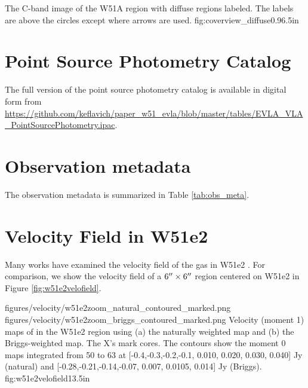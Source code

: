 {The C-band image of the W51A region with diffuse \hii regions labeled.  The labels
are above the circles except where arrows are used.}
{fig:coverview_diffuse}{0.9}{6.5in}

%

\clearpage
\section{Point Source Photometry Catalog}
\label{sec:SEDs}
The full version of the point source photometry catalog is available in digital
form from
\url{https://github.com/keflavich/paper_w51_evla/blob/master/tables/EVLA_VLA_PointSourcePhotometry.ipac}.



\section{Observation metadata}
\label{sec:obsmeta}
The observation metadata is summarized in Table \ref{tab:obs_meta}.




\section{Velocity Field in W51e2}
\label{sec:vfield}
Many works have examined the velocity field of the gas in W51e2
\citep{Zhang1997a,Keto2008b,Shi2010b,Shi2010a,Goddi2015b}.  For comparison, we
show the velocity field of a $6\mbox{$^{\prime\prime}$}\times6\mbox{$^{\prime\prime}$}$ region centered on W51e2
in Figure
\ref{fig:w51e2velofield}.

\FigureTwo
{figures/velocity/w51e2zoom_natural_contoured_marked.png}
{figures/velocity/w51e2zoom_briggs_contoured_marked.png}
{Velocity (moment 1) maps of \ortho \twotwo in the W51e2 region using (a) the
naturally weighted map and (b) the Briggs-weighted map.  The X's mark
\citet{Shi2010a} cores.   
The contours show the moment 0 maps integrated from 50 to 63 \kms at
[-0.4,-0.3,-0.2,-0.1, 0.010, 0.020, 0.030, 0.040] Jy \kms (natural) and
[-0.28,-0.21,-0.14,-0.07, 0.007, 0.0105, 0.014] Jy \kms (Briggs).
}
{fig:w51e2velofield}{1}{3.5in}



